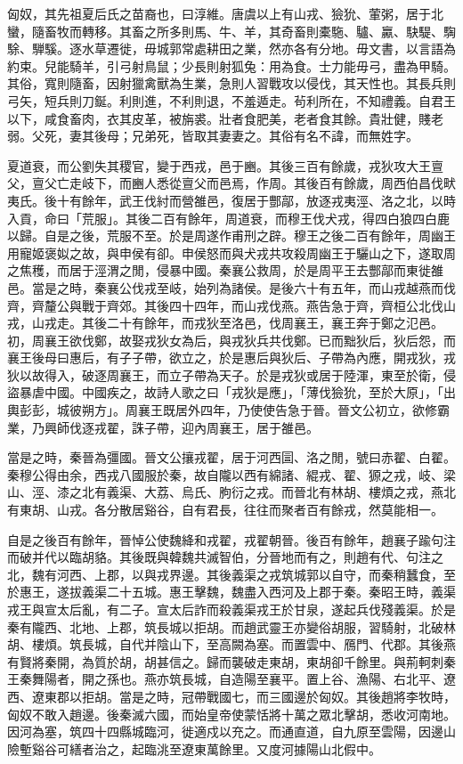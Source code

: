 
\begin{pinyinscope}
匈奴，其先祖夏后氏之苗裔也，曰淳維。唐虞以上有山戎、獫狁、葷粥，居于北蠻，隨畜牧而轉移。其畜之所多則馬、牛、羊，其奇畜則橐駞、驢、驘、駃騠、騊駼、騨騱。逐水草遷徙，毋城郭常處耕田之業，然亦各有分地。毋文書，以言語為約束。兒能騎羊，引弓射鳥鼠；少長則射狐兔：用為食。士力能毋弓，盡為甲騎。其俗，寬則隨畜，因射獵禽獸為生業，急則人習戰攻以侵伐，其天性也。其長兵則弓矢，短兵則刀鋋。利則進，不利則退，不羞遁走。茍利所在，不知禮義。自君王以下，咸食畜肉，衣其皮革，被旃裘。壯者食肥美，老者食其餘。貴壯健，賤老弱。父死，妻其後母；兄弟死，皆取其妻妻之。其俗有名不諱，而無姓字。

夏道衰，而公劉失其稷官，變于西戎，邑于豳。其後三百有餘歲，戎狄攻大王亶父，亶父亡走岐下，而豳人悉從亶父而邑焉，作周。其後百有餘歲，周西伯昌伐畎夷氏。後十有餘年，武王伐紂而營雒邑，復居于酆鄗，放逐戎夷涇、洛之北，以時入貢，命曰「荒服」。其後二百有餘年，周道衰，而穆王伐犬戎，得四白狼四白鹿以歸。自是之後，荒服不至。於是周遂作甫刑之辟。穆王之後二百有餘年，周幽王用寵姬褒姒之故，與申侯有卻。申侯怒而與犬戎共攻殺周幽王于驪山之下，遂取周之焦穫，而居于涇渭之閒，侵暴中國。秦襄公救周，於是周平王去酆鄗而東徙雒邑。當是之時，秦襄公伐戎至岐，始列為諸侯。是後六十有五年，而山戎越燕而伐齊，齊釐公與戰于齊郊。其後四十四年，而山戎伐燕。燕告急于齊，齊桓公北伐山戎，山戎走。其後二十有餘年，而戎狄至洛邑，伐周襄王，襄王奔于鄭之氾邑。初，周襄王欲伐鄭，故娶戎狄女為后，與戎狄兵共伐鄭。已而黜狄后，狄后怨，而襄王後母曰惠后，有子子帶，欲立之，於是惠后與狄后、子帶為內應，開戎狄，戎狄以故得入，破逐周襄王，而立子帶為天子。於是戎狄或居于陸渾，東至於衛，侵盜暴虐中國。中國疾之，故詩人歌之曰「戎狄是應」，「薄伐獫狁，至於大原」，「出輿彭彭，城彼朔方」。周襄王既居外四年，乃使使告急于晉。晉文公初立，欲修霸業，乃興師伐逐戎翟，誅子帶，迎內周襄王，居于雒邑。

當是之時，秦晉為彊國。晉文公攘戎翟，居于河西圁、洛之閒，號曰赤翟、白翟。秦穆公得由余，西戎八國服於秦，故自隴以西有綿諸、緄戎、翟、獂之戎，岐、梁山、涇、漆之北有義渠、大荔、烏氏、朐衍之戎。而晉北有林胡、樓煩之戎，燕北有東胡、山戎。各分散居谿谷，自有君長，往往而聚者百有餘戎，然莫能相一。

自是之後百有餘年，晉悼公使魏絳和戎翟，戎翟朝晉。後百有餘年，趙襄子踰句注而破并代以臨胡貉。其後既與韓魏共滅智伯，分晉地而有之，則趙有代、句注之北，魏有河西、上郡，以與戎界邊。其後義渠之戎筑城郭以自守，而秦稍蠶食，至於惠王，遂拔義渠二十五城。惠王擊魏，魏盡入西河及上郡于秦。秦昭王時，義渠戎王與宣太后亂，有二子。宣太后詐而殺義渠戎王於甘泉，遂起兵伐殘義渠。於是秦有隴西、北地、上郡，筑長城以拒胡。而趙武靈王亦變俗胡服，習騎射，北破林胡、樓煩。筑長城，自代并陰山下，至高闕為塞。而置雲中、鴈門、代郡。其後燕有賢將秦開，為質於胡，胡甚信之。歸而襲破走東胡，東胡卻千餘里。與荊軻刺秦王秦舞陽者，開之孫也。燕亦筑長城，自造陽至襄平。置上谷、漁陽、右北平、遼西、遼東郡以拒胡。當是之時，冠帶戰國七，而三國邊於匈奴。其後趙將李牧時，匈奴不敢入趙邊。後秦滅六國，而始皇帝使蒙恬將十萬之眾北擊胡，悉收河南地。因河為塞，筑四十四縣城臨河，徙適戍以充之。而通直道，自九原至雲陽，因邊山險塹谿谷可繕者治之，起臨洮至遼東萬餘里。又度河據陽山北假中。


\end{pinyinscope}
